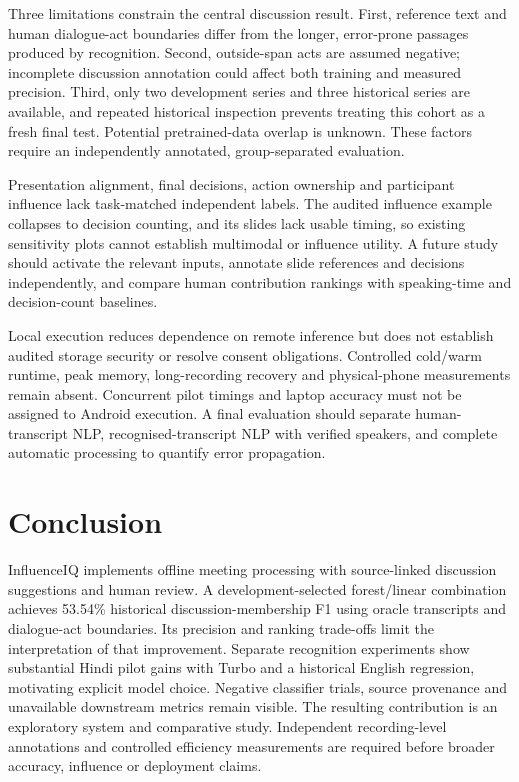 \documentclass[conference,a4paper]{IEEEtran}
\begin{document}
Three limitations constrain the central discussion result. First, reference text and human dialogue-act boundaries differ from the longer, error-prone passages produced by recognition. Second, outside-span acts are assumed negative; incomplete discussion annotation could affect both training and measured precision. Third, only two development series and three historical series are available, and repeated historical inspection prevents treating this cohort as a fresh final test. Potential pretrained-data overlap is unknown. These factors require an independently annotated, group-separated evaluation.

Presentation alignment, final decisions, action ownership and participant influence lack task-matched independent labels. The audited influence example collapses to decision counting, and its slides lack usable timing, so existing sensitivity plots cannot establish multimodal or influence utility. A future study should activate the relevant inputs, annotate slide references and decisions independently, and compare human contribution rankings with speaking-time and decision-count baselines.

Local execution reduces dependence on remote inference but does not establish audited storage security or resolve consent obligations. Controlled cold/warm runtime, peak memory, long-recording recovery and physical-phone measurements remain absent. Concurrent pilot timings and laptop accuracy must not be assigned to Android execution. A final evaluation should separate human-transcript NLP, recognised-transcript NLP with verified speakers, and complete automatic processing to quantify error propagation.

\section{Conclusion}
InfluenceIQ implements offline meeting processing with source-linked discussion suggestions and human review. A development-selected forest/linear combination achieves 53.54\% historical discussion-membership F1 using oracle transcripts and dialogue-act boundaries. Its precision and ranking trade-offs limit the interpretation of that improvement. Separate recognition experiments show substantial Hindi pilot gains with Turbo and a historical English regression, motivating explicit model choice. Negative classifier trials, source provenance and unavailable downstream metrics remain visible. The resulting contribution is an exploratory system and comparative study. Independent recording-level annotations and controlled efficiency measurements are required before broader accuracy, influence or deployment claims.
\end{document}
